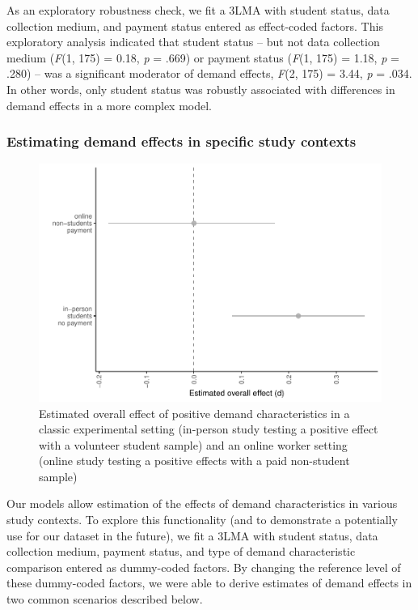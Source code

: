 \documentclass[
  man,floatsintext]{apa6}
\begin{document}
As an exploratory robustness check, we fit a 3LMA with student status, data collection medium, and payment status entered as effect-coded factors. This exploratory analysis indicated that student status -- but not data collection medium (\emph{F}(1, 175) = 0.18, \emph{p} = .669) or payment status (\emph{F}(1, 175) = 1.18, \emph{p} = .280) -- was a significant moderator of demand effects, \emph{F}(2, 175) = 3.44, \emph{p} = .034. In other words, only student status was robustly associated with differences in demand effects in a more complex model.

\hypertarget{estimating-demand-effects-in-specific-study-contexts}{%
\subsubsection{Estimating demand effects in specific study contexts}\label{estimating-demand-effects-in-specific-study-contexts}}

\begin{figure}
\centering
\includegraphics{metaware_manuscript_files/figure-latex/predplot-1.pdf}
\caption{\label{fig:predplot}Estimated overall effect of positive demand characteristics in a classic experimental setting (in-person study testing a positive effect with a volunteer student sample) and an online worker setting (online study testing a positive effects with a paid non-student sample)}
\end{figure}

Our models allow estimation of the effects of demand characteristics in various study contexts. To explore this functionality (and to demonstrate a potentially use for our dataset in the future), we fit a 3LMA with student status, data collection medium, payment status, and type of demand characteristic comparison entered as dummy-coded factors. By changing the reference level of these dummy-coded factors, we were able to derive estimates of demand effects in two common scenarios described below.
\end{document}
